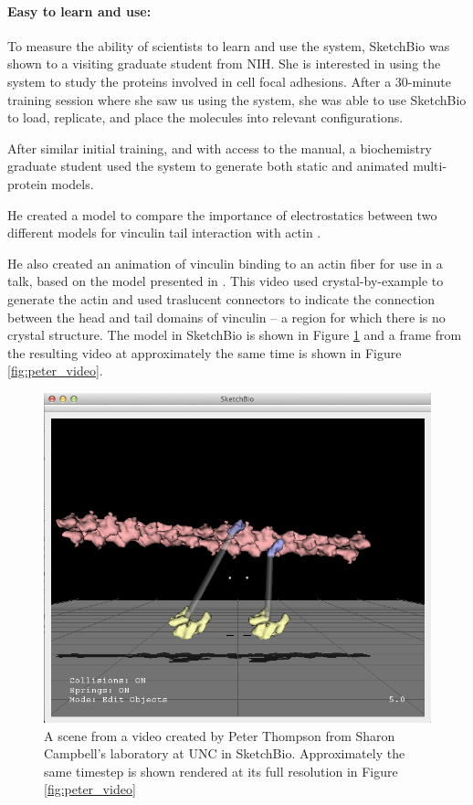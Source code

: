 \documentclass[twocolumn]{bmcart}%
\begin{document}
\paragraph*{Easy to learn and use:}
To measure the ability of scientists to learn and use the system, SketchBio was shown to a visiting graduate student from NIH.  She is interested in using the system to study the proteins involved in cell focal adhesions.
After a 30-minute training session where she saw us using the system, she was able to use SketchBio to load, replicate, and place the molecules into relevant configurations.

After similar initial training, and with access to the manual, a biochemistry graduate student used the system to generate both static and animated multi-protein models.

He created a model to compare the importance of electrostatics between two different models for vinculin tail interaction with actin \cite{janssen2006three}\cite{thompson2014identification}.

He also created an animation of vinculin binding to an actin fiber for use in a talk, based on the model presented in \cite{thievessen2013vinculin}.
This video used crystal-by-example to generate the actin and used traslucent connectors to indicate the connection between the head and tail domains of vinculin -- a region for which there is no crystal structure.
The model in SketchBio is shown in Figure \ref{fig:peter_model} and a frame from the resulting video at approximately the same time is shown in Figure \ref{fig:peter_video}.

\begin{figure}[h]
\centering
\includegraphics[width=0.9\columnwidth]{peter_model.png}
\caption{A scene from a video created by Peter Thompson from Sharon Campbell's laboratory at UNC  in SketchBio.
Approximately the same timestep is shown rendered at its full resolution in Figure \ref{fig:peter_video}}
\label{fig:peter_model}
\end{figure}
\end{document}
